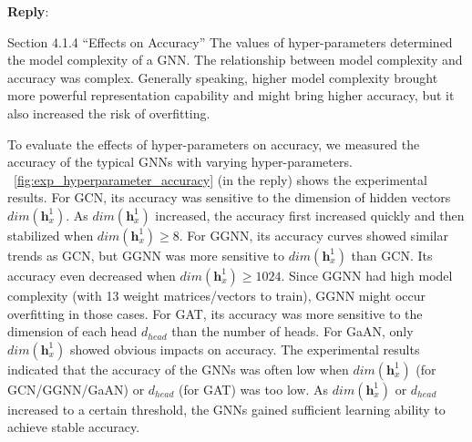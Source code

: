 \documentclass[12pt]{article}
\newcommand{\MyVec}[1]{\boldsymbol{#1}}
\newenvironment{myquote}[1]%
{\vspace{0.5em}\begin{zitat}{#1}}
{\end{zitat}\vspace{0.5em}}
\newenvironment{reply}
   {\medskip \noindent \textbf{Reply}:\  }
   {\medskip}
\begin{document}
\begin{reply}
    \begin{myquote}{Section 4.1.4 ``Effects on Accuracy''}
    The values of hyper-parameters determined the model complexity of a GNN.
    The relationship between model complexity and accuracy was complex.
    Generally speaking, higher model complexity brought more powerful representation capability and might bring higher accuracy, but it also increased the risk of overfitting.
    
    To evaluate the effects of hyper-parameters on accuracy, we measured the accuracy of the typical GNNs with varying hyper-parameters.
    \figurename~\ref{fig:exp_hyperparameter_accuracy} (in the reply) shows the experimental results.
    For GCN, its accuracy was sensitive to the dimension of hidden vectors $dim(\MyVec{h}^1_x)$.
    As $dim(\MyVec{h}^1_x)$ increased, the accuracy first increased quickly and then stabilized when $dim(\MyVec{h}_x^1) \geq 8$.
    For GGNN, its accuracy curves showed similar trends as GCN, but GGNN was more sensitive to $dim(\MyVec{h}_x^1)$ than GCN.
    Its accuracy even decreased when $dim(\MyVec{h}_x^1) \geq 1024$.
    Since GGNN had high model complexity (with 13 weight matrices/vectors to train), GGNN might occur overfitting in those cases.
    For GAT, its accuracy was more sensitive to the dimension of each head $d_{head}$ than the number of heads.
    For GaAN, only $dim(\MyVec{h}_x^1)$ showed obvious impacts on accuracy.
    The experimental results indicated that the accuracy of the GNNs was often low when $dim(\MyVec{h}_x^1)$ (for GCN/GGNN/GaAN) or $d_{head}$ (for GAT) was too low.
    As $dim(\MyVec{h}_x^1)$ or $d_{head}$ increased to a certain threshold, the GNNs gained sufficient learning ability to achieve stable accuracy.
    

\end{myquote}
\end{reply}
\end{document}
